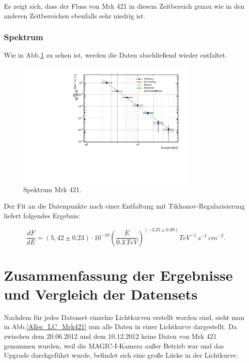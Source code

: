 Es zeigt sich, dass der Fluss von Mrk 421 in diesem Zeitbereich genau wie in den anderen Zeitbereichen ebenfalls sehr niedrig ist.


\subsubsection{Spektrum}

Wie in Abb.\ref{Datenset3_Spektrum_Mrk421} zu sehen ist, werden die Daten abschließend wieder entfaltet.

\begin{figure}
    \centering
    \includegraphics[width=0.8\textwidth]{./Plots/04_MrkAnalyse/Datenset3/Datenset3_Mrk421_Spektrum.pdf}
    \caption{Spektrum Mrk 421.}
    \label{Datenset3_Spektrum_Mrk421}
\end{figure}

Der Fit an die Datenpunkte nach einer Entfaltung mit Tikhonov-Regularisierung liefert folgendes Ergebnis:

\begin{equation}
 \frac{dF}{dE}=(5,42 \pm 0.23) \cdot 10^{-10}\left( \frac{E}{\SI{0,3}{TeV}} \right)^{(-3.25 \pm 0.09)} \si{TeV^{-1}\,s^{-1}\,cm^{-2}}.
\end{equation}

\FloatBarrier


\section{Zusammenfassung der Ergebnisse und Vergleich der Datensets}
\label{LC_Alles}

Nachdem für jedes Datenset einzelne Lichtkurven erstellt worden sind, sieht man in Abb.\ref{Alles_LC_Mrk421} nun alle Daten in einer Lichtkurve dargestellt.
Da zwischen dem 20.06.2012 und dem 10.12.2012 keine Daten von Mrk 421 genommen wurden, weil die MAGIC-I-Kamera außer Betrieb war und das Upgrade durchgeführt wurde, befindet sich eine große Lücke in der Lichtkurve.

